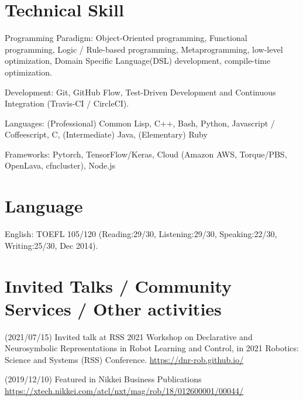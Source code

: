 \section{Technical Skill}

\begin{CV}
 \item[Programming Paradigm:] %
 Object-Oriented programming,
 Functional programming,
 Logic / Rule-based programming,
 Metaprogramming, low-level optimization,
 Domain Specific Language(DSL) development, compile-time optimization.
 \item[Development:] Git, GitHub Flow, Test-Driven Development and Continuous Integration (Travis-CI / CircleCI).
 \item[Languages:]
 (Professional) Common Lisp, C++, Bash, Python, Javascript / Coffeescript, C,
 (Intermediate) Java,
 (Elementary)   Ruby
 \item[Frameworks:] Pytorch, TensorFlow/Keras, Cloud (Amazon AWS, Torque/PBS, OpenLava, cfncluster),
 Node.js%
\end{CV}

\section{Language}

\begin{CV}
 \item[English:] TOEFL 105/120 (Reading:29/30, Listening:29/30,
 Speaking:22/30, Writing:25/30, Dec 2014).
\end{CV}

\section{Invited Talks / Community Services / Other activities}


(2021/07/15) Invited talk at RSS 2021 Workshop on Declarative and Neurosymbolic Representations in Robot Learning and Control,
in 2021 Robotics: Science and Systems (RSS) Conference. \url{https://dnr-rob.github.io/}

(2019/12/10) Featured in Nikkei Business Publications \url{https://xtech.nikkei.com/atcl/nxt/mag/rob/18/012600001/00044/}

